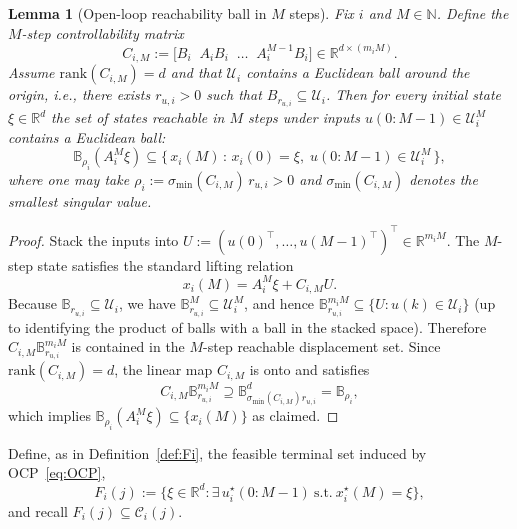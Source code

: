 \documentclass[12pt,draftcls,onecolumn]{IEEEtran}
\newtheorem{lemma}{Lemma}
\def\field#1{\mathbb #1}%
\def\R{\field{R}}%
\def\N{\field{N}}%
\def\B{\field{B}}%
\newcommand{\U}{\ensuremath{\mathcal U}}
\def\Cij{\mathcal{C}_i (j)}
\def\rank{\mathrm{rank}}
\begin{document}
\begin{lemma}[Open-loop reachability ball in $M$ steps]\label{lem:reach_ball}
Fix $i$ and $M\in\N$. Define the $M$-step controllability matrix
\[
C_{i,M}:=\big[B_i\;\;A_iB_i\;\;\dots\;\;A_i^{M-1}B_i\big]\in\R^{d\times (m_iM)}.
\]
Assume $\rank(C_{i,M})=d$ and that $\U_i$ contains a Euclidean ball around the origin,
i.e., there exists $r_{u,i}>0$ such that $B_{r_{u,i}}\subseteq \U_i$.
Then for every initial state $\xi\in\R^d$ the set of states reachable in $M$ steps under inputs
$u(0{:}M{-}1)\in \U_i^M$ contains a Euclidean ball:
\[
\B_{\rho_i}(A_i^M\xi)\subseteq \Big\{\,x_i(M)\,:\, x_i(0)=\xi,\; u(0{:}M{-}1)\in \U_i^M\,\Big\},
\]
where one may take $\rho_i := \sigma_{\min}(C_{i,M})\,r_{u,i}>0$ and
$\sigma_{\min}(C_{i,M})$ denotes the smallest singular value.
\end{lemma}

\begin{proof}
Stack the inputs into $U:=(u(0)^\top,\dots,u(M{-}1)^\top)^\top\in\R^{m_iM}$. The $M$-step
state satisfies the standard lifting relation
\[
x_i(M)=A_i^M\xi+C_{i,M}U.
\]
Because $\B_{r_{u,i}}\subseteq \U_i$, we have $\B_{r_{u,i}}^M\subseteq \U_i^M$, and hence
$\B_{r_{u,i}}^{m_iM}\subseteq \{U: u(k)\in \U_i\}$ (up to identifying the product of balls with a ball
in the stacked space). Therefore $C_{i,M}\B_{r_{u,i}}^{m_iM}$ is contained in the $M$-step
reachable displacement set. Since $\rank(C_{i,M})=d$, the linear map $C_{i,M}$
is onto and satisfies
\[
C_{i,M}\B_{r_{u,i}}^{m_iM}\supseteq \B_{\sigma_{\min}(C_{i,M})r_{u,i}}^{d}
= \B_{\rho_i},
\]
which implies $\B_{\rho_i}(A_i^M\xi)\subseteq \{x_i(M)\}$ as claimed.
\end{proof}

\medskip

Define, as in Definition~\ref{def:Fi}, the feasible terminal set induced by OCP~\eqref{eq:OCP},
\[
F_i(j):=\big\{\xi\in\R^d:\exists\,u_i^\star(0{:}M{-}1)\ \text{s.t.}\ x_i^\star(M)=\xi\big\},
\]
and recall $F_i(j)\subseteq \Cij$.
\end{document}
